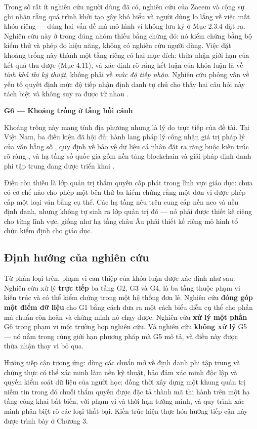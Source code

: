 Trong số rất ít nghiên cứu người dùng đã có, nghiên cứu của Zaeem và cộng sự ghi nhận rằng quá trình khởi tạo gây khó hiểu và người dùng lo lắng về việc mất khóa riêng \cite{Zaeem2021} --- đúng hai vấn đề mà mô hình ví không lưu ký ở Mục 2.3.4 đặt ra. Nghiên cứu này ở trong đúng nhóm thiếu bằng chứng đó: nó kiểm chứng bằng bộ kiểm thử và phép đo hiệu năng, không có nghiên cứu người dùng. Việc đặt khoảng trống này thành một tầng riêng có hai mục đích: thừa nhận giới hạn của kết quả thu được (Mục 4.11), và xác định rõ rằng kết luận của khóa luận là về \emph{tính khả thi kỹ thuật}, không phải về \emph{mức độ tiếp nhận}. Nghiên cứu phỏng vấn về yếu tố quyết định mức độ tiếp nhận định danh tự chủ cho thấy hai câu hỏi này tách biệt và không suy ra được từ nhau \cite{SSI_Adoption2025}.

\noindent \textbf{G6 --- Khoảng trống ở tầng bối cảnh}

Khoảng trống này mang tính địa phương nhưng là lý do trực tiếp của đề tài. Tại Việt Nam, ba điều kiện đã hội đủ: hành lang pháp lý công nhận giá trị pháp lý của văn bằng số \cite{TT10_2026}, quy định về bảo vệ dữ liệu cá nhân đặt ra ràng buộc kiến trúc rõ ràng \cite{LuatBVDLCN2025}, và hạ tầng số quốc gia gồm nền tảng blockchain và giải pháp định danh phi tập trung đang được triển khai \cite{NDAChain2025}.

Điều còn thiếu là lớp quản trị thẩm quyền cấp phát trong lĩnh vực giáo dục: chưa có cơ chế nào cho phép một bên thứ ba kiểm chứng rằng một đơn vị được phép cấp một loại văn bằng cụ thể. Các hạ tầng nêu trên cung cấp nền neo và nền định danh, nhưng không tự sinh ra lớp quản trị đó --- nó phải được thiết kế riêng cho từng lĩnh vực, giống như hạ tầng châu Âu phải thiết kế riêng mô hình tổ chức kiểm định cho giáo dục.

\subsection{Định hướng của nghiên cứu}

Từ phân loại trên, phạm vi can thiệp của khóa luận được xác định như sau. Nghiên cứu xử lý \textbf{trực tiếp} ba tầng G2, G3 và G4, là ba tầng thuộc phạm vi kiến trúc và có thể kiểm chứng trong một hệ thống đơn lẻ. Nghiên cứu \textbf{đóng góp một điểm dữ liệu} cho G1 bằng cách đưa ra một cách biểu diễn cụ thể cho phần mà chuẩn còn hoãn và chứng minh nó chạy được. Nghiên cứu \textbf{xử lý một phần} G6 trong phạm vi một trường hợp nghiên cứu. Và nghiên cứu \textbf{không xử lý} G5 --- nó nằm trong cùng giới hạn phương pháp mà G5 mô tả, và điều này được thừa nhận thay vì bỏ qua.

Hướng tiếp cận tương ứng: dùng các chuẩn mở về định danh phi tập trung và chứng thực có thể xác minh làm nền kỹ thuật, bảo đảm xác minh độc lập và quyền kiểm soát dữ liệu của người học; đồng thời xây dựng một khung quản trị niềm tin trong đó chuỗi thẩm quyền được đặc tả thành mã thi hành trên một hạ tầng công khai bất biến, với phạm vi và thời hạn tường minh, và quy trình xác minh phân biệt rõ các loại thất bại. Kiến trúc hiện thực hóa hướng tiếp cận này được trình bày ở Chương 3.

